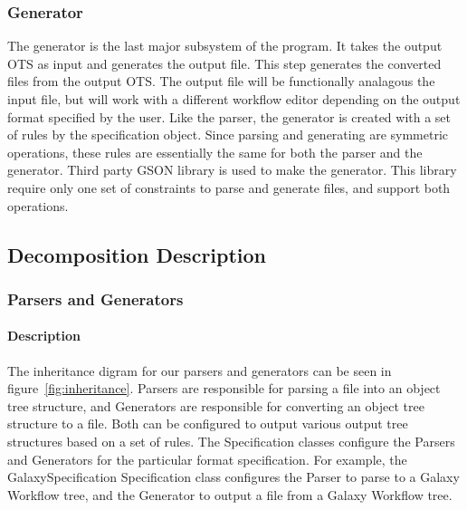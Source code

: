 \documentclass[12pt]{article}
\begin{document}
\subsubsection{Generator}

The generator is the last major subsystem of the program. It takes the output OTS as input and generates the output file. This step generates the converted files from the output OTS. The output file will be functionally analagous the input file, but will work with a different workflow editor depending on the output format specified by the user. Like the parser, the generator is created with a set of rules by the specification object. Since parsing and generating are symmetric operations, these rules are essentially the same for both the parser and the generator. Third party GSON library is used to make the generator. This library require only one set of constraints to parse and generate files, and support both operations.  

\subsection{Decomposition Description}

\subsubsection{Parsers and Generators}



\paragraph{Description}

The inheritance digram for our parsers and generators can be seen in figure~\ref{fig:inheritance}. Parsers are responsible for parsing a file into an object tree structure, and Generators are responsible for converting an object tree structure to a file. Both can be configured to output various output tree structures based on a set of rules. The Specification classes configure the Parsers and Generators for the particular format specification. For example, the GalaxySpecification Specification class configures the Parser to parse to a Galaxy Workflow tree, and the Generator to output a file from a Galaxy Workflow tree.
\end{document}
